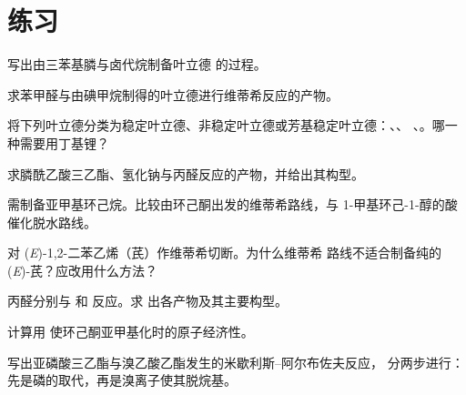 \section{练习}

\begin{exercise}[$\star$]\label{exo:b2:wittig:1}
写出由三苯基膦与卤代烷制备叶立德  的过程。
\end{exercise}

\begin{exercise}[$\star$]\label{exo:b2:wittig:2}
求苯甲醛与由碘甲烷制得的叶立德进行维蒂希反应的产物。
\end{exercise}

\begin{exercise}[$\star$]\label{exo:b2:wittig:3}
将下列叶立德分类为稳定叶立德、非稳定叶立德或芳基稳定叶立德：、、
、。哪一种需要用丁基锂？
\end{exercise}

\begin{exercise}[$\star$]\label{exo:b2:wittig:4}
求膦酰乙酸三乙酯、氢化钠与丙醛反应的产物，并给出其构型。
\end{exercise}

\begin{exercise}[$\star\star$]\label{exo:b2:wittig:5}
需制备亚甲基环己烷。比较由环己酮出发的维蒂希路线，与
1-甲基环己-1-醇的酸催化脱水路线。
\end{exercise}

\begin{exercise}[$\star\star$]\label{exo:b2:wittig:6}
对 (\textit{E})-1,2-二苯乙烯（芪）作维蒂希切断。为什么维蒂希
路线不适合制备纯的 (\textit{E})-芪？应改用什么方法？
\end{exercise}

\begin{exercise}[$\star\star$]\label{exo:b2:wittig:7}
丙醛分别与  和  反应。求
出各产物及其主要构型。
\end{exercise}

\begin{exercise}[$\star\star$]\label{exo:b2:wittig:8}
计算用  使环己酮亚甲基化时的原子经济性。
\end{exercise}

\begin{exercise}[$\star\star$]\label{exo:b2:wittig:9}
写出亚磷酸三乙酯与溴乙酸乙酯发生的米歇利斯–阿尔布佐夫反应，
分两步进行：先是磷的取代，再是溴离子使其脱烷基。
\end{exercise}

